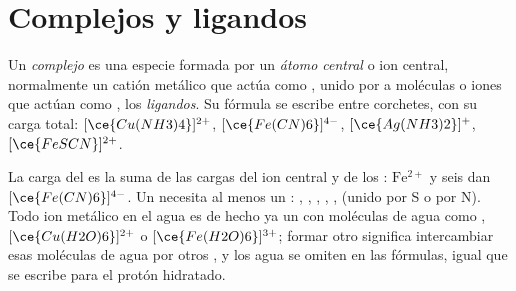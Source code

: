 \section{Complejos y ligandos}

\begin{definition}\label{def:b1:complexation:complex}
Un \emph{complejo} es una especie formada por un
\emph{átomo central} o ion central,
normalmente un catión metálico que actúa como , unido por
 a moléculas o iones que actúan como , los
\emph{ligandos}. Su fórmula se escribe entre corchetes, con
su carga total: $[\ce{Cu(NH3)4}]^{2+}$,
$[\ce{Fe(CN)6}]^{4-}$, $[\ce{Ag(NH3)2}]^{+}$, $[\ce{FeSCN}]^{2+}$.
\end{definition}

La carga del  es la suma de las cargas del ion central y de los
: $\mathrm{Fe^{2+}}$ y seis  dan
$[\ce{Fe(CN)6}]^{4-}$. Un  necesita al menos un :
, , , , ,  (unido por S o
por N). Todo ion metálico en el agua es de hecho ya un  con
moléculas de agua como , $[\ce{Cu(H2O)6}]^{2+}$ o
$[\ce{Fe(H2O)6}]^{3+}$; formar otro  significa intercambiar esas
moléculas de agua por otros , y los  agua se omiten en las
fórmulas, igual que se escribe  para el protón hidratado.

